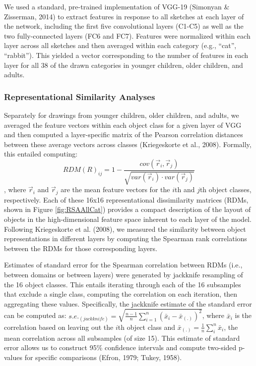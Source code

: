 \documentclass[10pt, letterpaper]{article}
\begin{document}
We used a standard, pre-trained implementation of VGG-19 (Simonyan \&
Zisserman, 2014) to extract features in response to all sketches at each
layer of the network, including the first five convolutional layers
(C1-C5) as well as the two fully-connected layers (FC6 and FC7).
Features were normalized within each layer across all sketches and then
averaged within each category (e.g., ``cat'', ``rabbit''). This yielded
a vector corresponding to the number of features in each layer for all
38 of the drawn categories in younger children, older children, and
adults.

\subsubsection{Representational Similarity
Analyses}\label{representational-similarity-analyses}

Separately for drawings from younger children, older children, and
adults, we averaged the feature vectors within each object class for a
given layer of VGG and then computed a layer-specific matrix of the
Pearson correlation distances between these average vectors across
classes (Kriegeskorte et al., 2008). Formally, this entailed computing:
\[RDM(R)_{ij} = 1- \frac{cov(\vec{r}_{i}, \vec{r}_{j})}{\sqrt{var(\vec{r}_{i}) \cdot var(\vec{r}_{j})}}\],
where \(\vec{r}_{i}\) and \(\vec{r}_{j}\) are the mean feature vectors
for the \(i\)th and \(j\)th object classes, respectively. Each of these
16x16 representational dissimilarity matrices (RDMs, shown in Figure
\ref{fig:RSAAllCat}) provides a compact description of the layout of
objects in the high-dimensional feature space inherent to each layer of
the model. Following Kriegeskorte et al. (2008), we measured the
similarity between object representations in different layers by
computing the Spearman rank correlations between the RDMs for those
corresponding layers.

Estimates of standard error for the Spearman correlation between RDMs
(i.e., between domains or between layers) were generated by jackknife
resampling of the 16 object classes. This entails iterating through each
of the 16 subsamples that exclude a single class, computing the
correlation on each iteration, then aggregating these values.
Specifically, the jackknife estimate of the standard error can be
computed as:
\(s.e._{(jackknife)} = \sqrt{\frac{n-1}{n} \sum_{i=1}^{n} (\bar{x}_{i} - \bar{x}_{(.)})^{2}}\),
where \(\bar{x}_{i}\) is the correlation based on leaving out the
\(i\)th object class and
\(\bar{x}_{(.)} = \frac{1}{n} \sum_{i}^{n} \bar{x}_{i}\), the mean
correlation across all subsamples (of size 15). This estimate of
standard error allows us to construct 95\% confidence intervals and
compute two-sided p-values for specific comparisons (Efron, 1979; Tukey,
1958).
\end{document}
